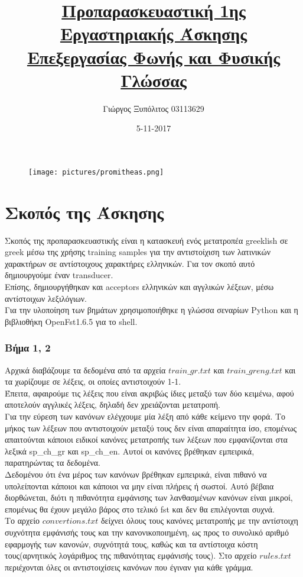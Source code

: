 \documentclass{article}
\title{\underline{Προπαρασκευαστική 1ης Εργαστηριακής Άσκησης}\\
	   \underline{Επεξεργασίας Φωνής και Φυσικής Γλώσσας}}
\date{5-11-2017}
\author{Γιώργος Ξυπόλιτος 03113629}
\begin{document}
\begin{figure}[h]
	\centering
	\texttt{[image: pictures/promitheas.png]}
	\maketitle
\end{figure}

\newpage
{}

\section*{Σκοπός της Άσκησης}
Σκοπός της προπαρασκευαστικής είναι η κατασκευή ενός μετατροπέα \textlatin{greeklish} σε \textlatin{greek} μέσω της χρήσης \textlatin{training samples} για την αντιστοίχιση των λατινικών χαρακτήρων σε αντίστοιχους χαρακτήρες ελληνικών. Για τον σκοπό αυτό δημιουργούμε έναν \textlatin{transducer}.\\
Επίσης, δημιουργήθηκαν και \textlatin{acceptors} ελληνικών και αγγλικών λέξεων, μέσω αντίστοιχων λεξιλόγιων.\\
Για την υλοποίηση των βημάτων χρησιμοποιήθηκε η γλώσσα σεναρίων \textlatin{Python} και η βιβλιοθήκη \textlatin{OpenFst1.6.5} για το \textlatin{shell}.

\subsubsection*{Βήμα 1, 2}
Αρχικά διαβάζουμε τα δεδομένα από τα αρχεία $train\_gr.txt$ και $train\_greng.txt$ και τα χωρίζουμε σε λέξεις, οι οποίες αντιστοιχούν 1-1.\\
Έπειτα, αφαιρούμε τις λέξεις που είναι ακριβώς ίδιες μεταξύ των δύο κειμένω, αφού αποτελούν αγγλικές λέξεις, δηλαδή δεν χρειάζονται μετατροπή.\\
Για την εύρεση των κανόνων ελέγχουμε μία λέξη από κάθε κείμενο την φορά. Το μήκος των λέξεων που αντιστοιχούν μεταξύ τους δεν είναι απαραίτητα ίσο, επομένως απαιτούνται κάποιοι ειδικοί κανόνες μετατροπής των λέξεων που εμφανίζονται στα λεξικά \textlatin{sp\_ch\_gr} και \textlatin{sp\_ch\_en}. Αυτοί οι κανόνες βρέθηκαν εμπειρικά, παρατηρώντας τα δεδομένα.\\
Δεδομένου ότι ένα μέρος των κανόνων βρέθηκαν εμπειρικά, είναι πιθανό να υπολείπονται κάποιοι και κάποιοι να μην είναι πλήρεις ή σωστοί.
Αυτό βέβαια διορθώνεται, διότι η πιθανότητα εμφάνισης των λανθασμένων κανόνων είναι μικροί, επομένως θα έχουν μεγάλο βάρος στο τελικό \textlatin{fst} και δεν θα επιλέγονται συχνά.\\
Το αρχείο $convertions.txt$ δείχνει όλους τους κανόνες μετατροπής με την αντίστοιχη συχνότητα εμφάνισής τους και την κανονικοποιημένη, ως προς το συνολικό αριθμό εφαρμογής των κανονών, συχνότητά τους, καθώς και τα αντίστοιχα κόστη τους(αρνητικός λογάριθμος της πιθανότητας εμφάνισής τους). Στο αρχείο $rules.txt$ περιέχονται όλες οι αντιστοιχίσεις κανόνων που έγιναν για κάθε γράμμα.
\end{document}
